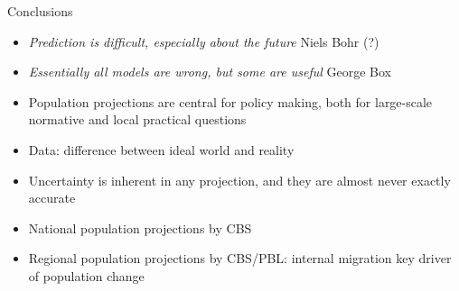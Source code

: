 \documentclass[final, 12pt, aspectratio=169, xcolor={dvipsnames}]{beamer}
\begin{document}
\begin{frame}{Conclusions}  
  \begin{itemize}
  \item \textit{Prediction is difficult, especially about the future} Niels Bohr (?)
  \item \textit{Essentially all models are wrong, but some are useful} George Box 
  \item Population projections are central for policy making, both for large-scale normative and local practical questions
  \item Data: difference between ideal world and reality
  \item Uncertainty is inherent in any projection, and they are almost never exactly accurate
  \item National population projections by CBS
  \item Regional population projections by CBS/PBL: internal migration key driver of population change

    \end{itemize}
\end{frame}
\end{document}
